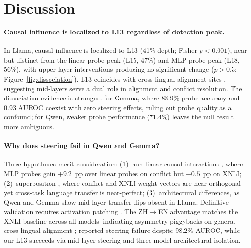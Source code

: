 \vspace{-6pt}
\section{Discussion}
\label{sec:discussion}
\vspace{-4pt}

\paragraph{Causal influence is localized to L13 regardless of detection peak.}
In Llama, causal influence is localized to L13 (41\% depth; Fisher $p < 0.001$), near but distinct from the linear probe peak (L15, 47\%) and MLP probe peak (L18, 56\%), with upper-layer interventions producing no significant change ($p > 0.3$; Figure~\ref{fig:dissociation}).
L13 coincides with cross-lingual alignment sites \citep{muller2021first, wendler2024llamas}, suggesting mid-layers serve a dual role in alignment and conflict resolution.
The dissociation evidence is strongest for Gemma, where 88.9\% probe accuracy and 0.93 AUROC coexist with zero steering effects, ruling out probe quality as a confound; for Qwen, weaker probe performance (71.4\%) leaves the null result more ambiguous.

\paragraph{Why does steering fail in Qwen and Gemma?}
Three hypotheses merit consideration: (1)~non-linear causal interactions \citep{elhage2022toy}, where MLP probes gain $+9.2$~pp over linear probes on conflict but $-0.5$~pp on XNLI; (2)~superposition \citep{templeton2024scaling}, where conflict and XNLI weight vectors are near-orthogonal yet cross-task language transfer is near-perfect; (3)~architectural differences, as Qwen and Gemma show mid-layer transfer dips absent in Llama.
Definitive validation requires activation patching \citep{meng2022locating}.
The ZH$\to$EN advantage matches the XNLI baseline across all models, indicating asymmetry piggybacks on general cross-lingual alignment \citep{zhao2026when, kargaran2024mexa, wendler2024llamas}; \citet{basu2026interpretability} reported steering failure despite 98.2\% AUROC, while our L13 succeeds via mid-layer steering and three-model architectural isolation.

